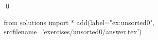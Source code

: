 
\begin{ex} 
  \label{ex:unsorted0}
  
  \qed
\end{ex} 
\begin{python0}
from solutions import *
add(label="ex:unsorted0",
    srcfilename='exercises/unsorted0/answer.tex') 
\end{python0}
